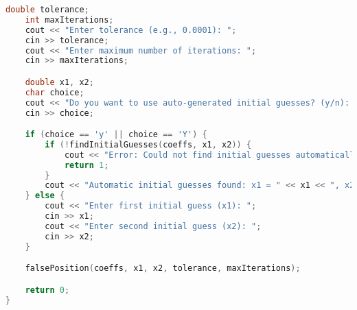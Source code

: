 \documentclass[12pt,a4paper]{article}
\begin{document}
\begin{lstlisting}[language=C++, caption={False Position Method for General Polynomials}, label={lst:falseposition}]
    double tolerance;
    int maxIterations;
    cout << "Enter tolerance (e.g., 0.0001): ";
    cin >> tolerance;
    cout << "Enter maximum number of iterations: ";
    cin >> maxIterations;

    double x1, x2;
    char choice;
    cout << "Do you want to use auto-generated initial guesses? (y/n): ";
    cin >> choice;

    if (choice == 'y' || choice == 'Y') {
        if (!findInitialGuesses(coeffs, x1, x2)) {
            cout << "Error: Could not find initial guesses automatically. Try manual input.\n";
            return 1;
        }
        cout << "Automatic initial guesses found: x1 = " << x1 << ", x2 = " << x2 << endl;
    } else {
        cout << "Enter first initial guess (x1): ";
        cin >> x1;
        cout << "Enter second initial guess (x2): ";
        cin >> x2;
    }

    falsePosition(coeffs, x1, x2, tolerance, maxIterations);

    return 0;
}
\end{lstlisting}
\end{document}
